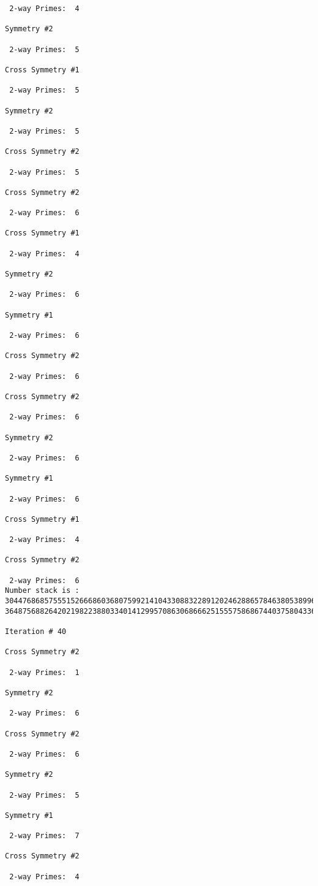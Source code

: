 \begin{verbatim}
 2-way Primes: 	4

Symmetry #2

 2-way Primes: 	5

Cross Symmetry #1

 2-way Primes: 	5

Symmetry #2

 2-way Primes: 	5

Cross Symmetry #2

 2-way Primes: 	5

Cross Symmetry #2

 2-way Primes: 	6

Cross Symmetry #1

 2-way Primes: 	4

Symmetry #2

 2-way Primes: 	6

Symmetry #1

 2-way Primes: 	6

Cross Symmetry #2

 2-way Primes: 	6

Cross Symmetry #2

 2-way Primes: 	6

Symmetry #2

 2-way Primes: 	6

Symmetry #1

 2-way Primes: 	6

Cross Symmetry #1

 2-way Primes: 	4

Cross Symmetry #2

 2-way Primes: 	6
Number stack is :
30447686857555152666860368075992141043308832289120246288657846380538996794608835958544046240163340857
36487568826420219822388033401412995708630686662515557586867440375804336104264044585953880649769983508

Iteration #	40

Cross Symmetry #2

 2-way Primes: 	1

Symmetry #2

 2-way Primes: 	6

Cross Symmetry #2

 2-way Primes: 	6

Symmetry #2

 2-way Primes: 	5

Symmetry #1

 2-way Primes: 	7

Cross Symmetry #2

 2-way Primes: 	4


\end{verbatim}
